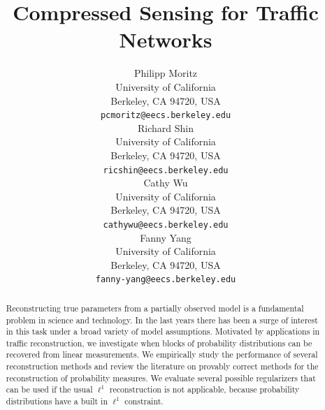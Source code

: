 \documentclass{article} %
\begin{document}
\title{Compressed Sensing for Traffic Networks}

\author{
Philipp Moritz\\
University of California\\
Berkeley, CA 94720, USA\\
\texttt{pcmoritz@eecs.berkeley.edu}\\
\And
Richard Shin\\
University of California\\
Berkeley, CA 94720, USA\\
\texttt{ricshin@eecs.berkeley.edu}\\
\And
Cathy Wu\\
University of California\\
Berkeley, CA 94720, USA\\
\texttt{cathywu@eecs.berkeley.edu}\\
\And
Fanny Yang\\
University of California\\
Berkeley, CA 94720, USA\\
\texttt{fanny-yang@eecs.berkeley.edu} \\
}

\maketitle

\begin{abstract}
Reconstructing true parameters from a partially observed model is a fundamental problem in science and technology.
In the last years there has been a surge of interest in this task under a broad variety of model assumptions.
Motivated by applications in traffic reconstruction, we investigate when blocks of probability distributions can be recovered from linear measurements.
We empirically study the performance of several reconstruction methods and review the literature on provably correct methods for the reconstruction of probability measures.
We evaluate several possible regularizers that can be used if the usual $\ell^1$ reconstruction is not applicable, because probability distributions have a built in $\ell^1$ constraint.
\end{abstract}
\end{document}
